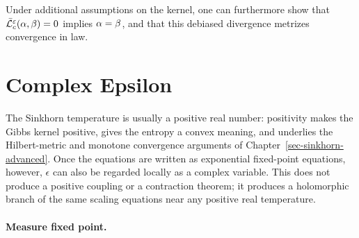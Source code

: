 \begin{rem}
	Under additional assumptions on the kernel, one can furthermore show that $\bar{\mathcal{L}}_c^\varepsilon(\alpha,\beta)=0$ implies $\alpha=\beta$, and that this debiased divergence metrizes convergence in law.
\end{rem}


\section{Complex Epsilon}
\label{sec-complex-epsilon}

The Sinkhorn temperature is usually a positive real number: positivity makes the Gibbs kernel positive, gives the entropy a convex meaning, and underlies the Hilbert-metric and monotone convergence arguments of Chapter~\ref{sec-sinkhorn-advanced}. Once the equations are written as exponential fixed-point equations, however, $\epsilon$ can also be regarded locally as a complex variable. This does not produce a positive coupling or a contraction theorem; it produces a holomorphic branch of the same scaling equations near any positive real temperature.

\paragraph{Measure fixed point.}

